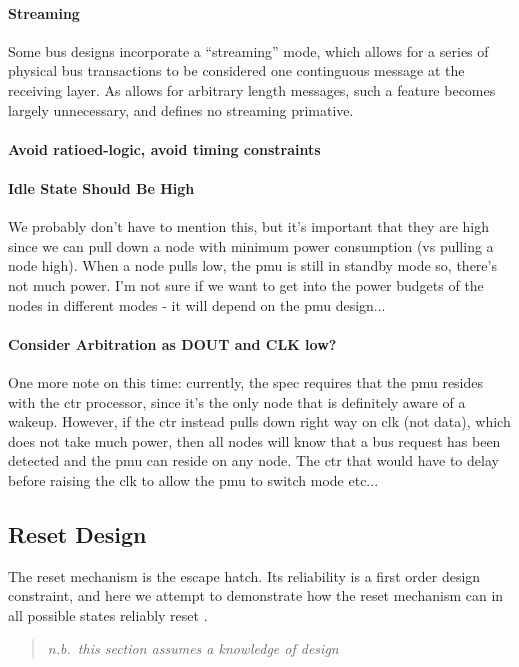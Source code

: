 \paragraph{Streaming}
Some bus designs incorporate a ``streaming'' mode, which allows for a series
of physical bus transactions to be considered one continguous message at the
receiving layer. As \bus allows for arbitrary length messages, such a feature
becomes largely unnecessary, and \bus defines no streaming primative.

\paragraph{Avoid ratioed-logic, avoid timing constraints}

\paragraph{Idle State Should Be High}
We probably don't have to mention this, but it's important that they are high
since we can pull down a node with minimum power consumption (vs pulling a
node high). When a node pulls low, the pmu is still in standby mode so,
there's not much power.  I'm not sure if we want to get into the power budgets
of the nodes in different modes - it will depend on the pmu design...

\paragraph{Consider Arbitration as DOUT and CLK low?}
One more note on this time:  currently, the spec requires that the pmu resides
with the ctr processor, since it's the only node that is definitely aware of a
wakeup.  However, if the ctr instead pulls down right way on clk (not data),
which does not take much power, then all nodes will know that a bus request
has been detected and the pmu can reside on any node.  The ctr that would have
to delay before raising the clk to allow the pmu to switch mode etc...

\subsection{Reset Design}
\label{sec:design-reset}
The reset mechanism is the \bus escape hatch. Its reliability is a first
order design constraint, and here we attempt to demonstrate how the reset
mechanism can in all possible states reliably reset \bus.
\begin{quote}
\em n.b.\ this section assumes a knowledge of \bus design
\end{quote}

